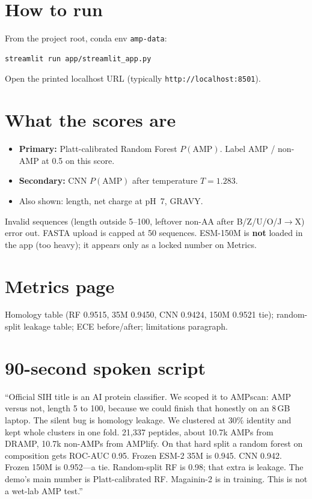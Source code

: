 \documentclass[11pt,a4paper]{report}
\begin{document}
\section{How to run}

From the project root, conda env \texttt{amp-data}:
\begin{verbatim}
streamlit run app/streamlit_app.py
\end{verbatim}
Open the printed localhost URL (typically \texttt{http://localhost:8501}).

\section{What the scores are}

\begin{itemize}
\item \textbf{Primary:} Platt-calibrated Random Forest $P(\mathrm{AMP})$. Label AMP / non-AMP at 0.5 on this score.
\item \textbf{Secondary:} CNN $P(\mathrm{AMP})$ after temperature $T=1.283$.
\item Also shown: length, net charge at pH~7, GRAVY.
\end{itemize}

Invalid sequences (length outside 5--100, leftover non-AA after B/Z/U/O/J$\rightarrow$X) error out. FASTA upload is capped at 50 sequences. ESM-150M is \textbf{not} loaded in the app (too heavy); it appears only as a locked number on Metrics.

\section{Metrics page}

Homology table (RF 0.9515, 35M 0.9450, CNN 0.9424, 150M 0.9521 tie); random-split leakage table; ECE before/after; limitations paragraph.

\section{90-second spoken script}

``Official SIH title is an AI protein classifier. We scoped it to AMPscan: AMP versus not, length 5 to 100, because we could finish that honestly on an 8\,GB laptop. The silent bug is homology leakage. We clustered at 30\% identity and kept whole clusters in one fold. 21{,}337 peptides, about 10.7k AMPs from DRAMP, 10.7k non-AMPs from AMPlify. On that hard split a random forest on composition gets ROC-AUC 0.95. Frozen ESM-2 35M is 0.945. CNN 0.942. Frozen 150M is 0.952---a tie. Random-split RF is 0.98; that extra is leakage. The demo's main number is Platt-calibrated RF. Magainin-2 is in training. This is not a wet-lab AMP test.''
\end{document}
